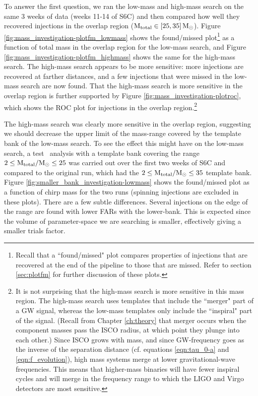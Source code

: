 To answer the first question, we ran the low-mass and high-mass search on the
same 3 weeks of data (weeks 11-14 of S6C) and then compared how well they
recovered injections in the overlap region ($\mathrm{M_{total}} \in [25,35]\,\mathrm{M_\odot}$).
Figure \ref{fig:mass_investigation-plotfm_lowmass} shows the found/missed
plot\footnote{Recall that a ``found/missed" plot compares properties of
injections that are recovered at the end of the pipeline to those that are
missed. Refer to section \ref{sec:plotfm} for further discussion of these
plots.} as a function of total mass in the overlap region for the low-mass
search, and Figure \ref{fig:mass_investigation-plotfm_highmass} shows the same
for the high-mass search. The high-mass search appears to be more sensitive:
more injections are recovered at farther distances, and a few injections that
were missed in the low-mass search are now found. That the high-mass search is
more sensitive in the overlap region is further supported by Figure
\ref{fig:mass_investigation-plotroc}, which shows the ROC plot for injections
in the overlap region.\footnote{It is not surprising that the high-mass search
is more sensitive in this mass region. The high-mass search uses templates that
include the ``merger" part of a GW signal, whereas the low-mass templates only
include the ``inspiral" part of the signal. (Recall from Chapter
\ref{ch:theory} that merger occurs when the component masses pass the \ac{ISCO}
radius, at which point they plunge into each other.) Since \ac{ISCO} grows with
mass, and since GW-frequency goes as the inverse of the separation distance
(cf. equations \ref{eqn:tau_0-a} and \ref{eqn:f_evolution}), high mass systems
merge at lower gravitational-wave frequencies. This means that higher-mass
binaries will have fewer inspiral cycles and will merge in the frequency range
to which the LIGO and Virgo detectors are most sensitive.}

The high-mass search was clearly more sensitive in the overlap region,
suggesting we should decrease the upper limit of the mass-range covered by the
template bank of the low-mass search. To see the effect this might have on the
low-mass search, a test \ihope~analysis with a template bank covering the range
$2 \leq \mathrm{M_{total}}/\mathrm{M_\odot} \leq 25$ was carried out over the first two weeks of S6C
and compared to the original run, which had the $2 \leq \mathrm{M_{total}}/\mathrm{M_\odot} \leq 35$
template bank. Figure \ref{fig:smaller_bank_investigation-lowmass} shows the
found/missed plot as a function of chirp mass for the two runs (spinning
injections are excluded in these plots). There are a few subtle differences.
Several injections on the edge of the range are found with lower \acp{FAR} with
the lower-bank. This is expected since the volume of parameter-space we are
searching is smaller, effectively giving a smaller trials factor.

